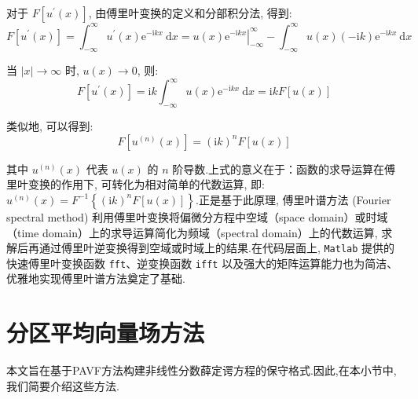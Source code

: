 对于 $F\left[u^{\prime}(x)\right]$, 由傅里叶变换的定义和分部积分法, 得到:
\begin{equation}
    F\left[u^{\prime}(x)\right] = \int_{-\infty}^{\infty} u^{\prime}(x) \mathrm{e}^{-\mathrm{i} k x} \mathrm{~d} x = \left.u(x) \mathrm{e}^{-\mathrm{i} k x}\right|_{-\infty}^{\infty} - \int_{-\infty}^{\infty} u(x)(-\mathrm{i} k) \mathrm{e}^{-\mathrm{i} k x} \mathrm{~d} x \label{eq:3-7}
\end{equation}

当 $\mid x\mid  \rightarrow \infty$ 时, $u(x) \rightarrow 0$, 则:
\begin{equation}
    F\left[u^{\prime}(x)\right] = \mathrm{i} k \int_{-\infty}^{\infty} u(x) \mathrm{e}^{-\mathrm{i} k x} \mathrm{~d} x = \mathrm{i} k F[u(x)] \label{eq:3-8}
\end{equation}

类似地, 可以得到:
\begin{equation}
    F\left[u^{(n)}(x)\right] = (\mathrm{i} k)^n F[u(x)] \label{eq:3-9}
\end{equation}

其中 $u^{(n)}(x)$ 代表 $u(x)$ 的 $n$ 阶导数.上式的意义在于：函数的求导运算在傅里叶变换的作用下, 可转化为相对简单的代数运算, 即: $u^{(n)}(x) = F^{-1}\left\{(\mathrm{i} k)^n F[u(x)]\right\}$.正是基于此原理, 傅里叶谱方法 (Fourier spectral method) 利用傅里叶变换将偏微分方程中空域（space domain）或时域（time domain）上的求导运算简化为频域（spectral domain）上的代数运算, 求解后再通过傅里叶逆变换得到空域或时域上的结果.在代码层面上, \texttt{Matlab} 提供的快速傅里叶变换函数 \texttt{fft}、逆变换函数 \texttt{ifft} 以及强大的矩阵运算能力也为简洁、优雅地实现傅里叶谱方法奠定了基础.


\section{分区平均向量场方法}

本文旨在基于PAVF方法构建非线性分数薛定谔方程的保守格式.因此,在本小节中,我们简要介绍这些方法.

